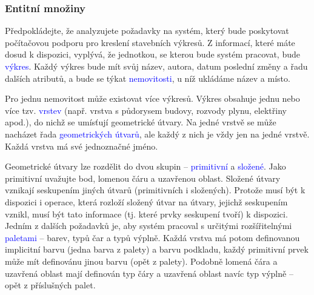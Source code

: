 \documentclass{beamer}
\begin{document}
  \begin{frame}
    \frametitle{Entitní množiny}
      \scriptsize{
      \hspace{0.5cm}Předpokládejte, že analyzujete požadavky na systém, který bude poskytovat počítačovou
      podporu pro kreslení stavebních výkresů. Z informací, které máte dosud k dispozici,
      vyplývá, že jednotkou, se kterou bude systém pracovat, bude \textcolor{blue}{výkres}. Každý výkres bude
      mít svůj název, autora, datum poslední změny a řadu dalších atributů, a bude se týkat
      \textcolor{blue}{nemovitosti}, u níž ukládáme název a místo.\par


      \hspace{0.5cm}Pro jednu nemovitost může existovat více výkresů. Výkres obsahuje jednu nebo více tzv.
      \textcolor{blue}{vrstev} (např. vrstva s půdorysem budovy, rozvody plynu, elektřiny apod.), do nichž se
      umísťují geometrické útvary. Na jedné vrstvě se může nacházet řada \textcolor{blue}{geometrických útvarů},
      ale každý z nich je vždy jen na jedné vrstvě. Každá vrstva má své jednoznačné jméno.\par


      \hspace{0.5cm}Geometrické útvary lze rozdělit do dvou skupin -- \textcolor{blue}{primitivní} a \textcolor{blue}{složené}. Jako primitivní
      uvažujte bod, lomenou čáru a uzavřenou oblast. Složené útvary vznikají seskupením jiných
      útvarů (primitivních i složených). Protože musí být k dispozici i operace, která rozloží
      složený útvar na útvary, jejichž seskupením vznikl, musí být tato informace (tj. které
      prvky seskupení tvoří) k dispozici. Jedním z dalších požadavků je, aby systém pracoval
      s určitými rozšířitelnými \textcolor{blue}{paletami} -- barev, typů čar a typů výplně. Každá vrstva má
      potom definovanou implicitní barvu (jedna barva  z  palety) a barvu podkladu, každý
      primitivní prvek může mít definovánu jinou barvu (opět z palety). Podobně lomená čára
      a uzavřená oblast mají definován typ čáry a uzavřená oblast navíc typ výplně – opět
      z příslušných palet.\par}
  \end{frame}
\end{document}
